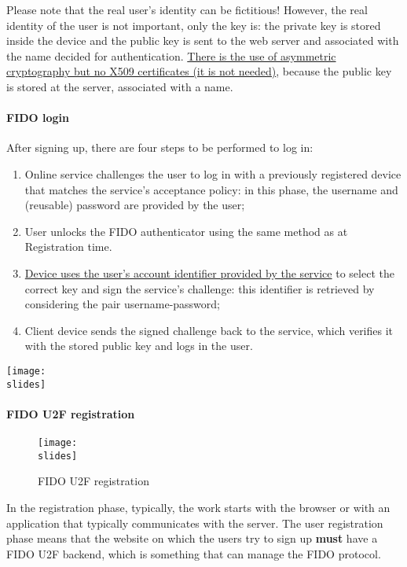 \vspace*{5mm}
Please note that the real user's identity can be fictitious! However, the real identity of the user is not important, only the key is: the private key is stored inside the device and the public key is sent to the web server and associated with the name decided for authentication. \ul{There is the use of asymmetric cryptography but no X509 certificates (it is not needed)}, because the public key is stored at the server, associated with a name.



\paragraph{FIDO login}

After signing up, there are four steps to be performed to log in:

\noindent
\begin{minipage}{0.4\textwidth}
  \begin{enumerate}
    \item Online service challenges the user to log in with a previously registered device that matches the service's acceptance policy: in this phase, the username and (reusable) password are provided by the user;
    \item User unlocks the FIDO authenticator using the same method as at Registration time.
    \item \underline{Device uses the user's account identifier provided by the service} to select the correct key and sign the service's challenge: this identifier is retrieved by considering the pair username-password;
    \item Client device sends the signed challenge back to the service, which verifies it with the stored public key and logs in the user.
  \end{enumerate}
\end{minipage}
\hspace{0.05\textwidth}
\begin{minipage}{0.5\textwidth}
  \centering
  \texttt{[image: \\slides]}
\end{minipage}


\paragraph{FIDO U2F registration}
\begin{figure}[h]
  \centering
  \texttt{[image: \\slides]}
  \caption{FIDO U2F registration}
\end{figure}
In the registration phase, typically, the work starts with the browser or with an application that typically communicates with the server. The user registration phase means that the website on which the users try to sign up \textbf{must} have a FIDO U2F backend, which is something that can manage the FIDO protocol.

